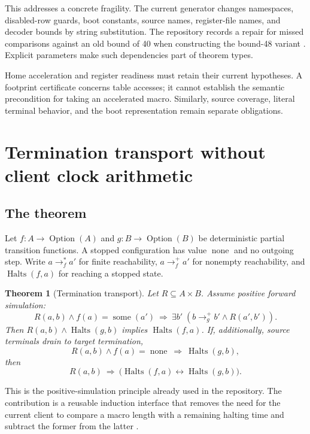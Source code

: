 \documentclass[11pt,a4paper]{article}
\newcommand{\code}[1]{\texttt{\detokenize{#1}}}
\newcommand{\Halts}{\operatorname{Halts}}
\newcommand{\some}{\operatorname{some}}
\newcommand{\none}{\operatorname{none}}
\newtheorem{theorem}{Theorem}[section]
\theoremstyle{remark}
\begin{document}
This addresses a concrete fragility. The current generator changes
namespaces, disabled-row guards, boot constants, source names, register-file
names, and decoder bounds by string substitution. The repository records a
repair for missed comparisons against an old bound of 40 when constructing
the bound-48 variant \cite{generator,rocqreadme}. Explicit parameters make
such dependencies part of theorem types.

Home acceleration and register readiness must retain their current
hypotheses. A footprint certificate concerns table accesses; it cannot
establish the semantic precondition for taking an accelerated macro.
Similarly, source coverage, literal terminal behavior, and the boot
representation remain separate obligations.

\section{Termination transport without client clock arithmetic}
\label{sec:transport}
\subsection{The theorem}
Let \(f:A\to\operatorname{Option}(A)\) and
\(g:B\to\operatorname{Option}(B)\) be deterministic partial transition
functions. A stopped configuration has value \(\none\) and no outgoing
step. Write \(a\to_f^*a'\) for finite reachability, \(a\to_f^+a'\) for
nonempty reachability, and \(\Halts(f,a)\) for reaching a stopped state.

\begin{theorem}[Termination transport]
\label{thm:transport}
Let \(R\subseteq A\times B\). Assume positive forward simulation:
\begin{equation}
 R(a,b)\land f(a)=\some(a')
 \ \Longrightarrow\
 \exists b'\;(b\to_g^+b'\land R(a',b')).
 \label{eq:sim}
\end{equation}
Then \(R(a,b)\land\Halts(g,b)\) implies \(\Halts(f,a)\).
If, additionally, source terminals drain to target termination,
\begin{equation}
 R(a,b)\land f(a)=\none\ \Longrightarrow\ \Halts(g,b),
 \label{eq:drain}
\end{equation}
then
\[
 R(a,b)\ \Longrightarrow\
   \bigl(\Halts(f,a)\longleftrightarrow\Halts(g,b)\bigr).
\]
\end{theorem}
This is the positive-simulation principle already used in the repository.
The contribution is a reusable induction interface that removes the need for
the current \code{KSim.halts_iff} client to compare a macro length with a
remaining halting time and subtract the former from the latter
\cite{ksim,proof-core-prior,further-prior}.
\end{document}
